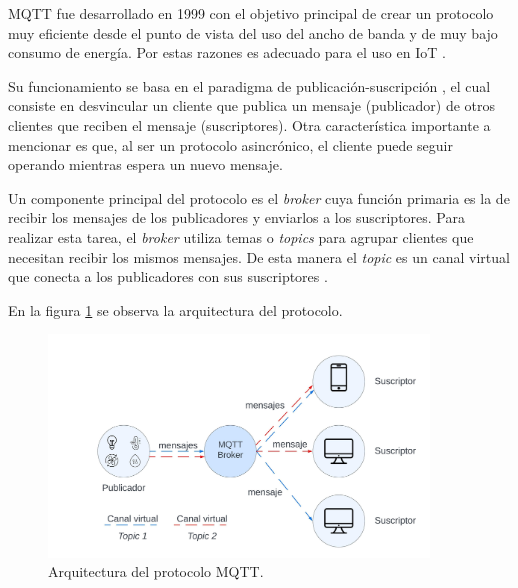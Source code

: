 MQTT fue desarrollado en 1999 con el objetivo principal de crear un protocolo muy eficiente desde el punto de vista del uso del ancho de banda y de muy bajo consumo de energía. Por estas razones es adecuado para el uso en IoT \citep{mqtt:1}.

Su funcionamiento se basa en el paradigma de publicación-suscripción \citep{pubsub}, el cual consiste en desvincular un cliente que publica un mensaje (publicador) de otros clientes que reciben el mensaje (suscriptores). Otra característica importante a mencionar es que, al ser un protocolo asincrónico, el cliente puede seguir operando mientras espera un nuevo mensaje.





Un componente principal del protocolo es el \textit{broker} cuya función primaria es la de recibir los mensajes de los publicadores y enviarlos a los  suscriptores. Para realizar esta tarea, el \textit{broker} utiliza temas o \textit{topics} para agrupar clientes que necesitan recibir los mismos mensajes. De esta manera el \textit{topic} es un canal virtual que conecta a los publicadores con sus suscriptores \citep{mqtt:1}.

En la figura \ref{fig:arqmqtt} se observa la arquitectura del protocolo.
\begin{figure}[h]
	\centering
	\includegraphics[width=0.90\textwidth]{./Figures/mqtt.jpeg}
	\caption[Arquitectura del protocolo MQTT]{Arquitectura del protocolo MQTT.}
	\label{fig:arqmqtt}

\end{figure}




